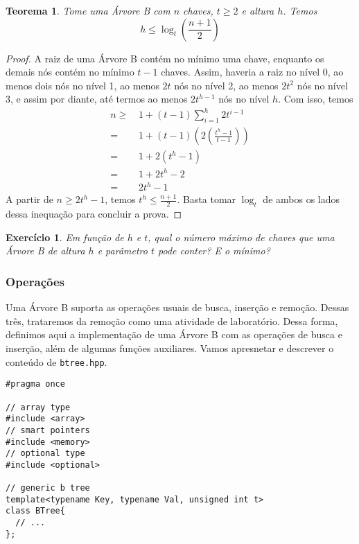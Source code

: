 \documentclass[11pt]{article}
\newtheorem{exercicio}{Exercício}
\newtheorem{theorem}{Teorema}
\begin{document}
\begin{theorem}
Tome uma Árvore B com \(n\) chaves, \(t \geq 2\) e altura \(h\).  Temos
$$
    h \leq \log_t\left( \frac{n + 1}{2} \right)
    $$
\end{theorem}

\begin{proof}
A raiz de uma Árvore B contém no mínimo uma chave, enquanto os
demais nós contém no mínimo \(t - 1\) chaves.  Assim, haveria a raiz
no nível 0, ao menos dois nós no nível 1, ao menos \(2t\) nós no
nível 2, ao menos \(2t^2\) nós no nível 3, e assim por diante, até
termos ao menos \(2t^{h - 1}\) nós no nível \(h\).  Com isso, temos
\begin{align}
n \geq&\, 1 + (t - 1)\sum_{i = 1}^{h} 2t^{i - 1} \\
     =&\, 1 + (t - 1)\left( 2\left( \frac{t^h - 1}{t - 1} \right) \right) \\
     =&\, 1 + 2(t^h - 1) \\
     =&\, 1 + 2t^h - 2 \\
     =&\, 2t^h - 1
\end{align}
A partir de \(n \geq 2t^h - 1\), temos \(t^h \leq \frac{n + 1}{2}\).
Basta tomar \(\log_t\) de ambos os lados dessa inequação para
concluir a prova.
\end{proof}

\begin{exercicio}
Em função de \(h\) e \(t\), qual o número máximo de chaves que uma
Árvore B de altura \(h\) e parâmetro \(t\) pode conter? E o mínimo?
\end{exercicio}

\subsubsection{Operações}
\label{sec:org83052d6}

Uma Árvore B suporta as operações usuais de busca, inserção e
remoção.  Dessas três, trataremos da remoção como uma atividade de
laboratório.  Dessa forma, definimos aqui a implementação de uma
Árvore B com as operações de busca e inserção, além de algumas
funções auxiliares.  Vamos apresnetar e descrever o conteúdo de
\texttt{btree.hpp}.

\begin{verbatim}
#pragma once

// array type
#include <array>
// smart pointers
#include <memory>
// optional type
#include <optional>

// generic b tree
template<typename Key, typename Val, unsigned int t>
class BTree{
  // ...
};
\end{verbatim}
\end{document}
